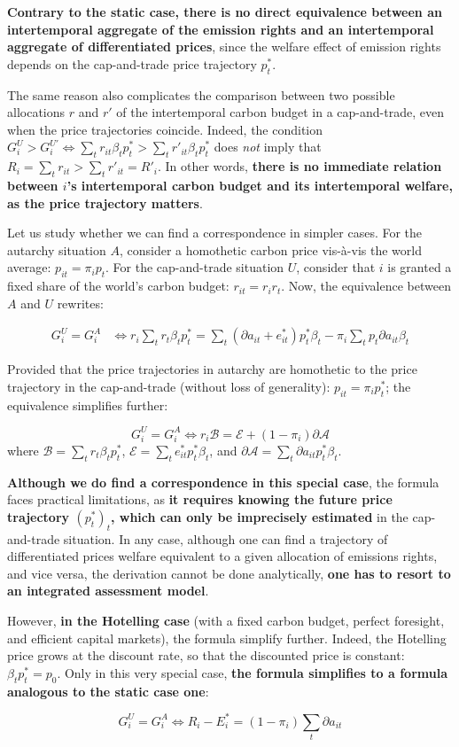 \documentclass[
  letterpaper,
  DIV=11,
  numbers=noendperiod]{scrartcl}
\begin{document}
\textbf{Contrary to the static case, there is no direct equivalence
between an intertemporal aggregate of the emission rights and an
intertemporal aggregate of differentiated prices}, since the welfare
effect of emission rights depends on the cap-and-trade price trajectory
\(p^*_t\).

The same reason also complicates the comparison between two possible
allocations \(r\) and \(r'\) of the intertemporal carbon budget in a
cap-and-trade, even when the price trajectories coincide. Indeed, the
condition
\(G^U_i > G^{U'}_i \Leftrightarrow \sum_t r_{it} \beta_t p^*_t > \sum_t r'_{it} \beta_t p^*_t\)
does \emph{not} imply that
\(R_i = \sum_t r_{it} > \sum_t r'_{it} = R'_i\). In other words,
\textbf{there is no immediate relation between \(i\)'s intertemporal
carbon budget and its intertemporal welfare, as the price trajectory
matters}.

Let us study whether we can find a correspondence in simpler cases. For
the autarchy situation \(A\), consider a homothetic carbon price
vis-à-vis the world average: \(p_{it}=\pi_ip_t\). For the cap-and-trade
situation \(U\), consider that \(i\) is granted a fixed share of the
world's carbon budget: \(r_{it}=r_ir_t\). Now, the equivalence between
\(A\) and \(U\) rewrites:

\[\begin{aligned}
G^U_i = G^A_i &\Leftrightarrow r_i \sum_t r_{t} \beta_t p^*_t  = \sum_t (\partial a_{it} + e^*_{it}) p^*_t \beta_t - \pi_i \sum_t p_{t} \partial a_{it} \beta_t  
\end{aligned}\]

Provided that the price trajectories in autarchy are homothetic to the
price trajectory in the cap-and-trade (without loss of generality):
\(p_{it}=\pi_ip^*_t\); the equivalence simplifies further:

\[G^U_i = G^A_i \Leftrightarrow r_i \mathscr{B} = \mathscr{E} + (1 - \pi_i) \mathscr{\partial A}\]
where \(\mathscr{B} = \sum_t r_{t} \beta_t p^*_t\),
\(\mathscr{E} = \sum_t e^*_{it} p^*_t \beta_t\), and
\(\mathscr{\partial A} = \sum_t \partial a_{it} p^*_t \beta_t\).

\textbf{Although we do find a correspondence in this special case}, the
formula faces practical limitations, as \textbf{it requires knowing the
future price trajectory \((p^*_t)_t\), which can only be imprecisely
estimated} in the cap-and-trade situation. In any case, although one can
find a trajectory of differentiated prices welfare equivalent to a given
allocation of emissions rights, and vice versa, the derivation cannot be
done analytically, \textbf{one has to resort to an integrated assessment
model}.

However, \textbf{in the Hotelling case} (with a fixed carbon budget,
perfect foresight, and efficient capital markets), the formula simplify
further. Indeed, the Hotelling price grows at the discount rate, so that
the discounted price is constant: \(\beta_t p^*_t = p_0\). Only in this
very special case, \textbf{the formula simplifies to a formula analogous
to the static case one}:

\[G^U_i = G^A_i \Leftrightarrow R_i - E^*_i = (1 - \pi_i) \sum_t{\partial a_{it}}\]
\end{document}
